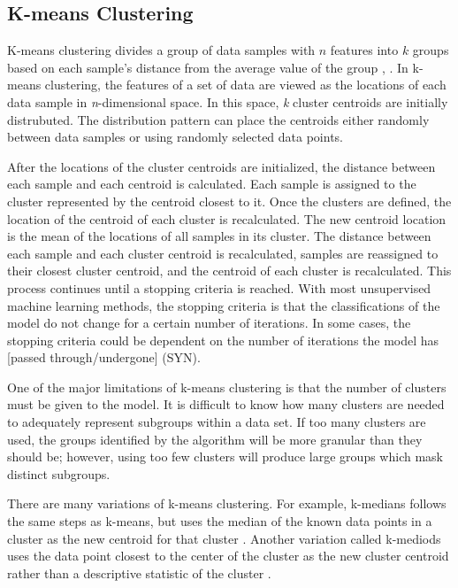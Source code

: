 \subsection{K-means Clustering}

K-means clustering divides a group of data samples with $n$ features into $k$ groups based on each sample's distance from the average value of the group \cite{macqueen1967}, \cite{Hartigan1979}. In k-means clustering, the features of a set of data are viewed as the locations of each data sample in \textit{n}-dimensional space. In this space, \textit{k} cluster centroids are initially distrubuted. The distribution pattern can place the centroids either randomly between data samples or using randomly selected data points.

After the locations of the cluster centroids are initialized, the distance between each sample and each centroid is calculated. Each sample is assigned to the cluster represented by the centroid closest to it. Once the clusters are defined, the location of the centroid of each cluster is recalculated. The new centroid location is the mean of the locations of all samples in its cluster. The distance between each sample and each cluster centroid is recalculated, samples are reassigned to their closest cluster centroid, and the centroid of each cluster is recalculated. This process continues until a stopping criteria is reached. With most unsupervised machine learning methods, the stopping criteria is that the classifications of the model do not change for a certain number of iterations. In some cases, the stopping criteria could be dependent on the number of iterations the model has [passed through/undergone] (SYN). 

One of the major limitations of k-means clustering is that the number of clusters must be given to the model. It is difficult to know how many clusters are needed to adequately represent subgroups within a data set. If too many clusters are used, the groups identified by the algorithm will be more granular than they should be; however, using too few clusters will produce large groups which mask distinct subgroups. 

There are many variations of k-means clustering. For example, k-medians follows the same steps as k-means, but uses the median of the known data points in a cluster as the new centroid for that cluster \cite{Juan1998}. Another variation called k-mediods uses the data point closest to the center of the cluster as the new cluster centroid rather than a descriptive statistic of the cluster \cite{Kaufman1987}.

